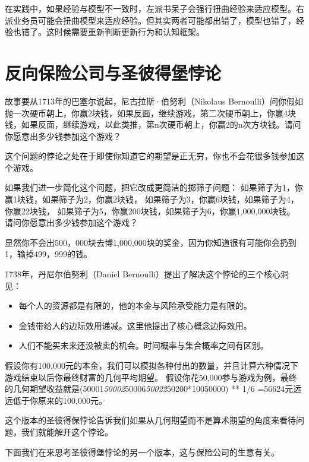 \documentclass[
  oneside]{book}
\providecommand{\tightlist}{%
  \setlength{\itemsep}{0pt}\setlength{\parskip}{0pt}}
\begin{document}
在实践中，如果经验与模型不一致时，左派书呆子会强行扭曲经验来适应模型。右派业务员可能会扭曲模型来适应经验。但其实两者可能都出错了，模型也错了，经验也错了。这时候需要重新判断更新行为和认知框架。

\hypertarget{ux53cdux5411ux4fddux9669ux516cux53f8ux4e0eux5723ux5f7cux5f97ux5821ux6096ux8bba}{%
\chapter{反向保险公司与圣彼得堡悖论}\label{ux53cdux5411ux4fddux9669ux516cux53f8ux4e0eux5723ux5f7cux5f97ux5821ux6096ux8bba}}

故事要从1713年的巴塞尔说起，尼古拉斯·伯努利（Nikolaus Bernoulli）问你假如抛一次硬币朝上，你赢2块钱，如果反面，继续游戏，第二次硬币朝上，你赢4块钱，如果反面，继续游戏，以此类推，第n次硬币朝上，你赢2的n次方块钱。请问你愿意出多少钱参加这个游戏？

这个问题的悖论之处在于即使你知道它的期望是正无穷，你也不会花很多钱参加这个游戏。

如果我们进一步简化这个问题，把它改成更简洁的掷筛子问题：
如果筛子为1，你赢1块钱，如果筛子为2，你赢2块钱，
如果筛子为3，你赢6块钱，如果筛子为4，你赢22块钱，
如果筛子为5，你赢200块钱，如果筛子为6，你赢1,000,000块钱。
请问你愿意出多少钱参加这个游戏？

显然你不会出500，000块去博1,000,000块的奖金，因为你知道很有可能你会扔到1，输掉499，999的钱。

1738年，丹尼尔伯努利（Daniel Bernoulli）提出了解决这个悖论的三个核心洞见：

\begin{itemize}
\tightlist
\item
  每个人的资源都是有限的，他的本金与风险承受能力是有限的。
\item
  金钱带给人的边际效用递减。这里他提出了核心概念边际效用。
\item
  人们不能买未来还没被卖的机会。时间概率与集合概率之间有区别。
\end{itemize}

假设你有100,000元的本金，我们可以模拟各种付出的数量，并且计算六种情况下游戏结束以后你最终财富的几何平均期望。
假设你花50,000参与游戏为例，最终的几何期望收益就是(50001\emph{50002}50006\emph{50022}50200*10050000) ** 1/6 =56624元远远低于你原来的100,000元。

这个版本的圣彼得保悖论告诉我们如果从几何期望而不是算术期望的角度来看待问题，我们就能解开这个悖论。

下面我们在来思考圣彼得堡悖论的另一个版本，这与保险公司的生意有关。
\end{document}
